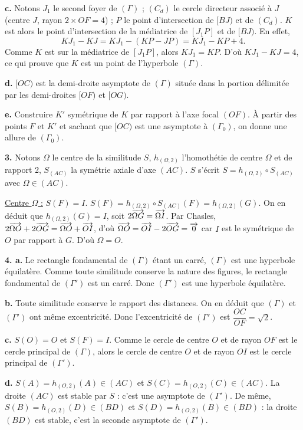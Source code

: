 \documentclass[11pt]{article}
\begin{document}
\textbf{c.} Notons $J_1$ le second foyer de $(\Gamma)$ ; $(C_d)$ le cercle directeur associé à $J$ (centre $J$, rayon $2 \times OF = 4$) ; $P$ le point d'intersection de $[BJ)$ et de $(C_d)$. $K$ est alors le point d'intersection de la médiatrice de $[J_1 P]$ et de $[BJ)$. En effet,
\[ KJ_1 - KJ = KJ_1 - (KP - JP) = KJ_1 - KP + 4. \]
Comme $K$ est sur la médiatrice de $[J_1 P]$, alors $KJ_1 = KP$. D'où $KJ_1 - KJ = 4$, ce qui prouve que $K$ est un point de l'hyperbole $(\Gamma)$.

\textbf{d.} $[OC)$ est la demi-droite asymptote de $(\Gamma)$ située dans la portion délimitée par les demi-droites $[OF)$ et $[OG)$.

\textbf{e.} Construire $K'$ symétrique de $K$ par rapport à l'axe focal $(OF)$. À partir des points $F$ et $K'$ et sachant que $[OC)$ est une asymptote à $(\Gamma_0)$, on donne une allure de $(\Gamma_0)$.

\textbf{3.} Notons $\Omega$ le centre de la similitude $S$, $h_{(\Omega,2)}$ l'homothétie de centre $\Omega$ et de rapport 2, $S_{(AC)}$ la symétrie axiale d'axe $(AC)$. $S$ s'écrit $S = h_{(\Omega,2)} \circ S_{(AC)}$ avec $\Omega \in (AC)$.

\underline{Centre $\Omega$ :} $S(F) = I$. $S(F) = h_{(\Omega,2)} \circ S_{(AC)}(F) = h_{(\Omega,2)}(G)$. On en déduit que $h_{(\Omega,2)}(G) = I$, soit $2\overrightarrow{\Omega G} = \overrightarrow{\Omega I}$. Par Chasles, $2\overrightarrow{\Omega O} + 2\overrightarrow{OG} = \overrightarrow{\Omega O} + \overrightarrow{OI}$, d'où $\overrightarrow{\Omega O} = \overrightarrow{OI} - 2\overrightarrow{OG} = \overrightarrow{0}$ car $I$ est le symétrique de $O$ par rapport à $G$. D'où $\Omega = O$.

\textbf{4. a.} Le rectangle fondamental de $(\Gamma)$ étant un carré, $(\Gamma)$ est une hyperbole équilatère. Comme toute similitude conserve la nature des figures, le rectangle fondamental de $(\Gamma')$ est un carré. Donc $(\Gamma')$ est une hyperbole équilatère.

\textbf{b.} Toute similitude conserve le rapport des distances. On en déduit que $(\Gamma)$ et $(\Gamma')$ ont même excentricité. Donc l'excentricité de $(\Gamma')$ est $\dfrac{OC}{OF} = \sqrt{2}$.

\textbf{c.} $S(O) = O$ et $S(F) = I$. Comme le cercle de centre $O$ et de rayon $OF$ est le cercle principal de $(\Gamma)$, alors le cercle de centre $O$ et de rayon $OI$ est le cercle principal de $(\Gamma')$.

\textbf{d.} $S(A) = h_{(O,2)}(A) \in (AC)$ et $S(C) = h_{(O,2)}(C) \in (AC)$. La droite $(AC)$ est stable par $S$ : c'est une asymptote de $(\Gamma')$. De même, $S(B) = h_{(O,2)}(D) \in (BD)$ et $S(D) = h_{(O,2)}(B) \in (BD)$ : la droite $(BD)$ est stable, c'est la seconde asymptote de $(\Gamma')$.
\end{document}
